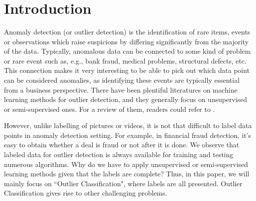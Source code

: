 \documentclass[english]{article}
\author{\authorthing}
\title{\textbf{\titlemark}}
\begin{document}
\maketitle


\section{Introduction}
\par Anomaly detection (or outlier detection) is the identification of rare items, events or observations which raise suspicions by differing significantly from the majority of the data. Typically, anomalous data can be connected to some kind of problem or rare event such as, e.g., bank fraud, medical problems, structural defects, etc. This connection makes it very interesting to be able to pick out which data point can be considered anomalies, as identifying these events are typically essential from a business perspective. There have been plentiful literatures on machine learning methods for outlier detection, and they generally focus on unsupervised or semi-supervised ones. For a review of them, readers could refer to \cite{review}.
\par However, unlike labelling of pictures or videos, it is not that difficult to label data points in anomaly detection setting. For example, in financial fraud detection, it's easy to obtain whether a deal is fraud or not after it is done. We observe that labeled data for outlier detection is always available for training and testing numerous algorithms. Why do we have to apply unsupervised or semi-supervised learning methods given that the labels are complete? Thus, in this paper, we will mainly focus on ``Outlier Classification", where labels are all presented.
\indent Outlier Classification gives rise to other challenging problems. 
\end{document}
